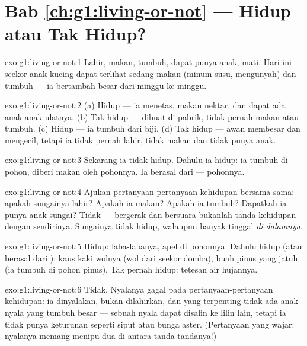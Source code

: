 \section*{Bab \ref{ch:g1:living-or-not} --- Hidup atau Tak Hidup?}

\begin{solution}{exo:g1:living-or-not:1}
Lahir, makan, tumbuh, dapat punya anak, mati. Hari ini seekor anak
kucing dapat terlihat sedang makan (minum susu, mengunyah) dan tumbuh
--- ia bertambah besar dari minggu ke minggu.
\end{solution}

\begin{solution}{exo:g1:living-or-not:2}
(a) Hidup --- ia menetas, makan nektar, dan dapat ada anak-anak
ulatnya. (b) Tak hidup --- dibuat di pabrik, tidak pernah makan atau
tumbuh. (c) Hidup --- ia tumbuh dari biji. (d) Tak hidup --- awan
membesar dan mengecil, tetapi ia tidak pernah lahir, tidak makan dan
tidak punya anak.
\end{solution}

\begin{solution}{exo:g1:living-or-not:3}
Sekarang ia tidak hidup. Dahulu ia hidup: ia tumbuh di pohon, diberi
makan oleh pohonnya. Ia berasal dari  --- pohonnya.
\end{solution}

\begin{solution}{exo:g1:living-or-not:4}
Ajukan pertanyaan-pertanyaan kehidupan bersama-sama: apakah sungainya
lahir? Apakah ia makan? Apakah ia tumbuh? Dapatkah ia punya anak
sungai? Tidak --- bergerak dan bersuara bukanlah tanda kehidupan
dengan sendirinya. Sungainya tidak hidup, walaupun banyak  tinggal \emph{di dalamnya}.
\end{solution}

\begin{solution}{exo:g1:living-or-not:5}
Hidup: laba-labanya, apel di pohonnya. Dahulu hidup (atau berasal dari
): kaus kaki wolnya (wol dari seekor domba), buah pinus
yang jatuh (ia tumbuh di pohon pinus). Tak pernah hidup: tetesan air
hujannya.
\end{solution}

\begin{solution}{exo:g1:living-or-not:6}
Tidak. Nyalanya gagal pada pertanyaan-pertanyaan kehidupan: ia
dinyalakan, bukan dilahirkan, dan yang terpenting tidak ada anak nyala
yang tumbuh besar --- sebuah nyala dapat disalin ke lilin lain, tetapi
ia tidak punya keturunan seperti siput atau bunga aster. (Pertanyaan
yang wajar: nyalanya memang menipu dua di antara tanda-tandanya!)
\end{solution}

